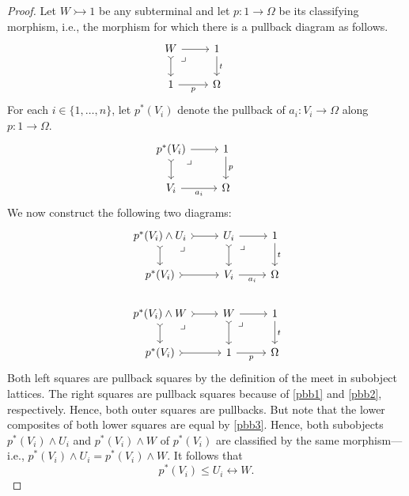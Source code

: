 \documentclass[12pt]{amsart}
\theoremstyle{plain}
\theoremstyle{definition}
\begin{document}
\begin{proof}
    Let $W\rightarrowtail 1$ be any subterminal and let $p \colon 1 \to \Omega$ be its classifying morphism, i.e., the morphism for which there is a pullback diagram as follows.
    \begin{equation}\label{pbb2}
        \begin{tikzcd}
        	W \arrow[dr, phantom, very near start, "\lrcorner"]& 1 & \\
        	1 & \Omega 
        	\arrow[from=1-1, to=1-2]
        	\arrow[tail, from=1-1, to=2-1]
        	\arrow["t", from=1-2, to=2-2]
        	\arrow["p"', from=2-1, to=2-2]
        \end{tikzcd}
    \end{equation}
    For each $i \in \{1, \dots, n\}$, let $p^*(V_i)$ denote the pullback of $a_i\colon V_i\to\Omega$ along $p\colon 1\to\Omega$.
    \begin{equation}
        \label{pbb3}
        \begin{tikzcd}
        	{p^*(V_i)} \arrow[dr, phantom, very near start, "\lrcorner"] & 1 & \\
        	{V_i} & \Omega 
        	\arrow[from=1-1, to=1-2]
        	\arrow[tail, from=1-1, to=2-1]
        	\arrow["p", from=1-2, to=2-2]
        	\arrow["{a_i}"', from=2-1, to=2-2]
        \end{tikzcd}
    \end{equation}
    We now construct the following two diagrams:
    \[
    \begin{tikzcd}
    	{p^*(V_i)\wedge U_i}\arrow[dr, phantom, very near start, "\lrcorner"] & {U_i}\arrow[dr, phantom, very near start, "\lrcorner"] & 1 \\
    	{p^*(V_i)} & {V_i} & \Omega \\
    	{p^*(V_i)\wedge W} \arrow[dr, phantom, very near start, "\lrcorner"] & W\arrow[dr, phantom, very near start, "\lrcorner"] & 1 \\
    	{p^*(V_i)} & 1 & \Omega
    	\arrow[from=1-1, to=1-2, tail]
    	\arrow[tail, from=1-1, to=2-1]
    	\arrow[from=1-2, to=1-3]
    	\arrow[tail, from=1-2, to=2-2]
    	\arrow["t", from=1-3, to=2-3]
    	\arrow[tail, from=2-1, to=2-2]
    	\arrow["{a_i}", swap, from=2-2, to=2-3]
    	\arrow[tail, from=3-1, to=3-2]
    	\arrow[tail, from=3-1, to=4-1]
    	\arrow[from=3-2, to=3-3]
    	\arrow[tail, from=3-2, to=4-2]
    	\arrow["t", from=3-3, to=4-3]
    	\arrow[tail, from=4-1, to=4-2]
    	\arrow["p"', from=4-2, to=4-3]
    \end{tikzcd}
    \]
    Both left squares are pullback squares by the definition of the meet in subobject lattices. The right squares are pullback squares because of \eqref{pbb1} and \eqref{pbb2}, respectively. Hence, both outer squares are pullbacks. But note that the lower composites of both lower squares are equal by \eqref{pbb3}. Hence, both subobjects $p^*(V_i)\wedge U_i$ and $p^*(V_i)\wedge W$ of $p^*(V_i)$ are classified by the same morphism---i.e., $p^*(V_i)\wedge U_i=p^*(V_i)\wedge W$. It follows that
    \[
        p^*(V_i)\leq U_i\leftrightarrow W.
    \]
    

\end{proof}
\end{document}
